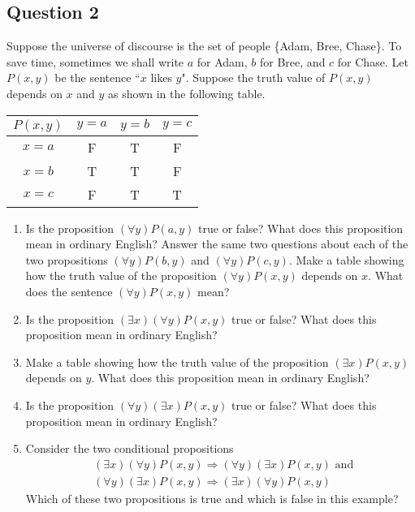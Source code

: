 \documentclass{article}
\begin{document}
\subsection*{Question 2}
    Suppose the universe of discourse is the set of people \{Adam, Bree, Chase\}. To save time, sometimes we shall write $a$ for Adam, $b$ for Bree, and $c$ for Chase. Let $P(x, y)$ be the sentence ``$x$ likes $y$". Suppose the truth value of $P(x, y)$ depends on $x$ and $y$ as shown in the following table.
    \begin{center}
        \begin{tabular}{|c|ccc|}
            \hline
            $P(x,y)$ & $y = a$ & $y = b$ & $y = c$ \\
            \hline
            $x = a$ & F & T & F \\
            $x = b$ & T & T & F \\
            $x = c$ & F & T & T \\
            \hline
        \end{tabular}
    \end{center}
    \begin{enumerate}
        \item Is the proposition $(\forall y)P(a, y)$ true or false? What does this proposition mean in ordinary English? Answer the same two questions about each of the two propositions $(\forall y)P(b, y)$ and $(\forall y)P(c, y)$. Make a table showing how the truth value of the proposition $(\forall y)P(x, y)$ depends on $x$. What does the sentence $(\forall y)P(x, y)$ mean?
        \item Is the proposition $(\exists x)(\forall y)P(x, y)$ true or false? What does this proposition mean in ordinary English?
        \item Make a table showing how the truth value of the proposition $(\exists x)P(x, y)$ depends on $y$. What does this proposition mean in ordinary English?
        \item Is the proposition $(\forall y)(\exists x)P(x, y)$ true or false? What does this proposition mean in ordinary English?
        \item Consider the two conditional propositions 
        \begin{align*}
            & (\exists x)(\forall y)P(x, y) \Rightarrow (\forall y)(\exists x)P(x, y) \text{ and } \\
            & (\forall y)(\exists x)P(x, y) \Rightarrow (\exists x)(\forall y)P(x, y)
        \end{align*}
        Which of these two propositions is true and which is false in this example?
    \end{enumerate}
\end{document}
